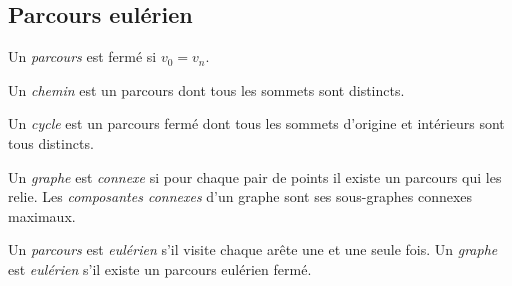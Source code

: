 \subsection{Parcours eulérien}
\begin{mydef}
  Un \emph{parcours} est fermé si $v_0 = v_n$.
\end{mydef}

\begin{mydef}
  Un \emph{chemin} est un parcours dont tous les sommets sont distincts.
\end{mydef}

\begin{mydef}
  Un \emph{cycle} est un parcours fermé dont tous les sommets d'origine et intérieurs sont tous distincts.
\end{mydef}

\begin{mydef}
  Un \emph{graphe} est \emph{connexe} si pour chaque pair de points il existe un parcours qui les relie. Les \emph{composantes connexes} d'un graphe sont ses sous-graphes connexes maximaux.
\end{mydef}

\begin{mydef}
  Un \emph{parcours} est \emph{eulérien} s'il visite chaque arête une et une seule fois. Un \emph{graphe} est \emph{eulérien} s'il existe un parcours eulérien fermé.
\end{mydef}

